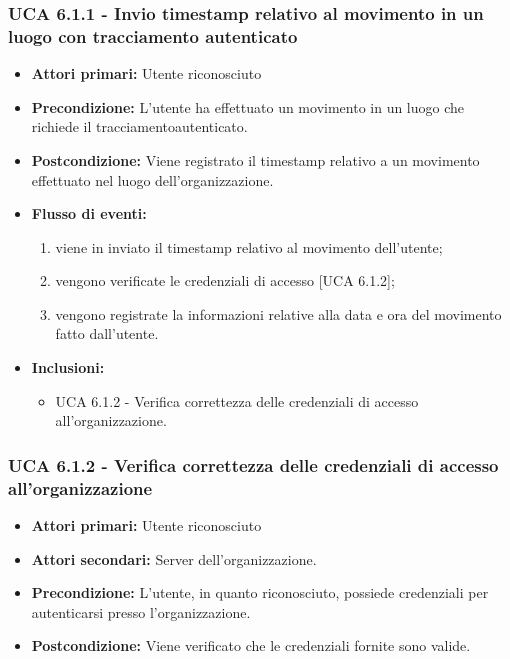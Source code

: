 \subsubsection{UCA 6.1.1 - Invio timestamp relativo al movimento in un luogo con tracciamento autenticato}
\begin{itemize}
	\item \textbf{Attori primari:} Utente riconosciuto
	\item \textbf{Precondizione:} L'utente ha effettuato un movimento in un luogo che richiede il tracciamentoautenticato.
	\item \textbf{Postcondizione:} Viene registrato il timestamp relativo a un movimento effettuato nel luogo dell'organizzazione.
	\item \textbf{Flusso di eventi:}
		\begin{enumerate}
			\item viene in inviato il timestamp relativo al movimento dell'utente;
			\item vengono verificate le credenziali di accesso [UCA 6.1.2];
			\item vengono registrate la informazioni relative alla data e ora del movimento fatto dall'utente.
		\end{enumerate}
	\item \textbf{Inclusioni:}
		\begin{itemize}
			\item UCA 6.1.2 - Verifica correttezza delle credenziali di accesso all'organizzazione.
		\end{itemize}
\end{itemize}

\subsubsection{UCA 6.1.2 - Verifica correttezza delle credenziali di accesso all'organizzazione}
\begin{itemize}
	\item \textbf{Attori primari:} Utente riconosciuto
	\item \textbf{Attori secondari:} Server dell'organizzazione.
	\item \textbf{Precondizione:} L'utente, in quanto riconosciuto, possiede credenziali per autenticarsi presso l'organizzazione.
	\item \textbf{Postcondizione:} Viene verificato che le credenziali fornite sono valide.
\end{itemize}

